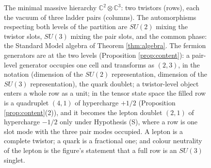 \documentclass[11pt]{article}
\theoremstyle{definition}
\newcommand{\C}{\mathbb{C}}
\begin{document}
\begin{figure}[ht]
\centering
{}
\caption{The minimal massive hierarchy $\C^{2} \otimes \C^{3}$: two twistors (rows), each the vacuum of three ladder pairs (columns). The automorphisms respecting both levels of the partition are $SU(2)$ mixing the twistor slots, $SU(3)$ mixing the pair slots, and the common phase: the Standard Model algebra of Theorem \ref{thm:algebra}. The fermion generators are at the two levels (Proposition \ref{prop:content}): a pair-level generator occupies one cell and transforms as $(2,3)$, in the notation (dimension of the $SU(2)$ representation, dimension of the $SU(3)$ representation), the quark doublet; a twistor-level object enters a whole row as a unit; in the tensor state space the filled row is a quadruplet $(4,1)$ of hypercharge $+1/2$ (Proposition \ref{prop:content}(2)), and it becomes the lepton doublet $(2,1)$ of hypercharge $-1/2$ only under Hypothesis (S), where a row is one slot mode with the three pair modes occupied. A lepton is a complete twistor; a quark is a fractional one; and colour neutrality of the lepton is the figure's statement that a full row is an $SU(3)$ singlet.}
\label{fig:hierarchy}
\end{figure}
\end{document}
